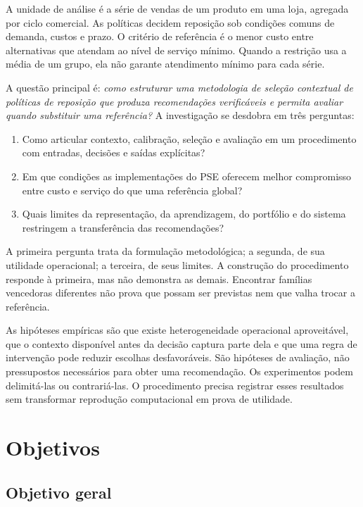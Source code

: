 A unidade de análise é a série de vendas de um produto em uma loja, agregada por ciclo comercial. As políticas decidem reposição sob condições comuns de demanda, custos e prazo. O critério de referência é o menor custo entre alternativas que atendam ao nível de serviço mínimo. Quando a restrição usa a média de um grupo, ela não garante atendimento mínimo para cada série.

A questão principal é: \emph{como estruturar uma metodologia de seleção contextual de políticas de reposição que produza recomendações verificáveis e permita avaliar quando substituir uma referência?} A investigação se desdobra em três perguntas:

\begin{enumerate}
  \item Como articular contexto, calibração, seleção e avaliação em um procedimento com entradas, decisões e saídas explícitas?
  \item Em que condições as implementações do PSE oferecem melhor compromisso entre custo e serviço do que uma referência global?
  \item Quais limites da representação, da aprendizagem, do portfólio e do sistema restringem a transferência das recomendações?
\end{enumerate}

A primeira pergunta trata da formulação metodológica; a segunda, de sua utilidade operacional; a terceira, de seus limites. A construção do procedimento responde à primeira, mas não demonstra as demais. Encontrar famílias vencedoras diferentes não prova que possam ser previstas nem que valha trocar a referência.

As hipóteses empíricas são que existe heterogeneidade operacional aproveitável, que o contexto disponível antes da decisão captura parte dela e que uma regra de intervenção pode reduzir escolhas desfavoráveis. São hipóteses de avaliação, não pressupostos necessários para obter uma recomendação. Os experimentos podem delimitá-las ou contrariá-las. O procedimento precisa registrar esses resultados sem transformar reprodução computacional em prova de utilidade.

\section{Objetivos}

\subsection*{Objetivo geral}

